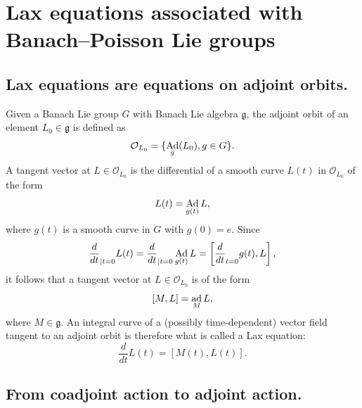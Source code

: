 \documentclass[a4paper,12pt,reqno]{amsart}%
\theoremstyle{definition}
\theoremstyle{remark}
\numberwithin{theorem}{section}
\numberwithin{equation}{section}
\newcommand{\1}{{\bf 1}}
\DeclareMathOperator{\ad}{\textnormal{ad}}
\DeclareMathOperator{\Ad}{\textnormal{Ad}}
\newcommand{\g}{{\mathfrak g}}
\begin{document}
\section{Lax equations associated with Banach--Poisson Lie groups}\label{sec:Lax}


\subsection{Lax equations are equations on adjoint orbits.}
Given a Banach Lie group $G$ with Banach Lie algebra $\g$, the adjoint orbit of an element $L_0\in \g$ is defined as
\[
\mathcal{O}_{L_0} = \{\Ad_g(L_0), g \in G\}.
\]
A tangent vector at $L\in \mathcal{O}_{L_0}$ is the differential of a smooth curve $L(t)$ in  $\mathcal{O}_{L_0}$ of the form
\[
L(t) = \Ad_{g(t)}L,
\]
where $g(t)$ is a smooth curve in $G$ with $g(0) = e$. Since
\[
\frac{d}{dt}_{|t = 0} L(t) =  \frac{d}{dt}_{|t = 0} \Ad_{g(t)}L = \left[\frac{d}{dt}_{t = 0}g(t), L\right],
\]
it follows that a tangent vector at $L\in \mathcal{O}_{L_0}$ is of the form
\[
[M, L] = \ad_M L,
\]
where $M\in \g$. 
An integral curve of a (possibly time-dependent) vector field tangent to an adjoint orbit is therefore what is called a Lax equation:
\[
\frac{d}{dt}L(t) = [M(t), L(t)].
\]

\subsection{From coadjoint action to adjoint action.}\label{ssec:ad}
\end{document}
